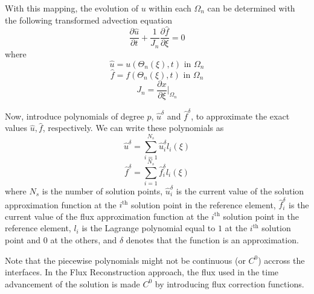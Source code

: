 With this mapping, the evolution of $u$ within each $\Omega_n$ can be determined with the following 
transformed advection equation
\begin{equation}
\frac{\partial \hat{u}}{\partial t} + \frac{1}{J_n}\frac{\partial \hat{f}}{\partial \xi} = 0
\end{equation}
where
\begin{equation}
\hat{u} = u(\Theta_n(\xi),t) \text{ in } \Omega_n
\end{equation}
\begin{equation}
\hat{f} = f(\Theta_n(\xi),t) \text{ in } \Omega_n
\end{equation}
\begin{equation}
J_n = \frac{\partial x}{\partial \xi} \bigg|_{\Omega_n}
\end{equation}

Now, introduce polynomials of degree $p$, $\hat{u}^\delta$ and $\hat{f}^\delta$, to 
approximate the exact values $\hat{u},\hat{f}$, respectively. We can write these polynomials as
\begin{equation}
\hat{u}^\delta = \sum_{i=1}^{N_s} \hat{u}_i^\delta l_i(\xi)
\end{equation}
\begin{equation}
\hat{f}^\delta = \sum_{i=1}^{N_s} \hat{f}_i^\delta l_i(\xi)
\end{equation}
where $N_s$ is the number of solution points, $\hat{u}_i^\delta$ is the current value of the 
solution approximation function at the $i^\text{th}$ solution point in the reference element, 
$\hat{f}_i^\delta$ is the current value of the flux approximation function at the $i^\text{th}$ 
solution point in the reference element, $l_i$ is the Lagrange polynomial equal to $1$ at the 
$i^\text{th}$ solution point and $0$ at the others, and $\delta$ denotes that the function is an 
approximation.

Note that the piecewise polynomials might not be continuous (or $C^0$) accross the interfaces. In the 
Flux Reconstruction approach, the flux used in the time advancement of the solution is made $C^0$ 
by introducing flux correction functions.

